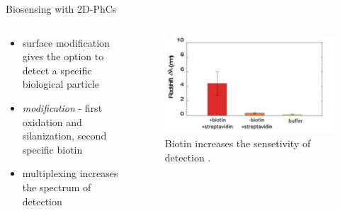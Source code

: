 \begin{frame}{Biosensing with 2D-PhCs}
  \begin{columns}

  \begin{column}{0.49\textwidth}
    \begin{itemize}
    \setlength\itemsep{1.2em}
    \item{ surface modification gives the option to detect a specific biological particle}
    \item{ \emph{modification} - first oxidation and silanization, second specific biotin}
    \item{ multiplexing increases the spectrum of detection}
  \end{itemize}
  \end{column}

  \begin{column}{0.49\textwidth}
  \begin{figure}
    \centering
    \includegraphics[width=1\textwidth]{./bilder/biotin.png}
    \caption{Biotin increases the sensetivity of detection \cite{nano}.}
    \label{fig: redshift}
  \end{figure}
  \end{column}

  \end{columns}
\end{frame}


